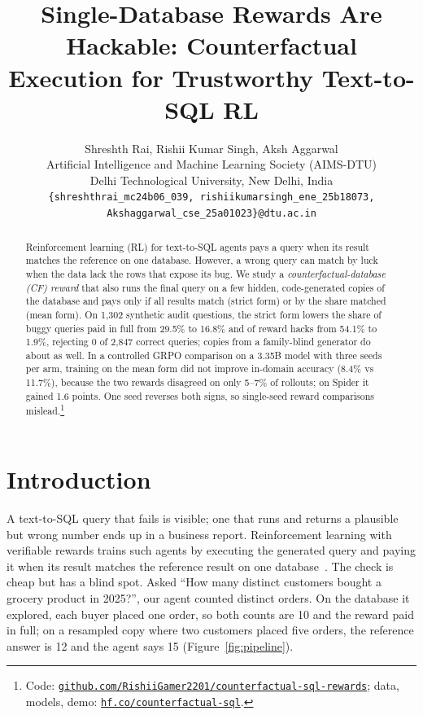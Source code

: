 \documentclass{article}
\title{Single-Database Rewards Are Hackable: Counterfactual Execution for Trustworthy Text-to-SQL RL}
\author{%
  Shreshth Rai, \quad Rishii Kumar Singh, \quad Aksh Aggarwal \\
  Artificial Intelligence and Machine Learning Society (AIMS-DTU) \\
  Delhi Technological University, New Delhi, India \\
  {\small\texttt{\{shreshthrai\_mc24b06\_039, rishiikumarsingh\_ene\_25b18073,}} \\
  {\small\texttt{Akshaggarwal\_cse\_25a01023\}@dtu.ac.in}}
}
\begin{document}
\maketitle

\begin{abstract}
Reinforcement learning (RL) for text-to-SQL agents pays a query when its result matches the reference on one database. However, a wrong query can match by luck when the data lack the rows that expose its bug. We study a \emph{counterfactual-database (CF) reward} that also runs the final query on a few hidden, code-generated copies of the database and pays only if all results match (strict form) or by the share matched (mean form). On 1,302 synthetic audit questions, the strict form lowers the share of buggy queries paid in full from 29.5\% to 16.8\% and of reward hacks from 54.1\% to 1.9\%, rejecting 0 of 2,847 correct queries; copies from a family-blind generator do about as well. In a controlled GRPO comparison on a 3.35B model with three seeds per arm, training on the mean form did not improve in-domain accuracy (8.4\% vs 11.7\%), because the two rewards disagreed on only 5--7\% of rollouts; on Spider it gained 1.6 points. One seed reverses both signs, so single-seed reward comparisons mislead.\footnote{Code: \href{https://github.com/RishiiGamer2201/counterfactual-sql-rewards}{\nolinkurl{github.com/RishiiGamer2201/counterfactual-sql-rewards}}; data, models, demo: \href{https://huggingface.co/counterfactual-sql}{\nolinkurl{hf.co/counterfactual-sql}}.}
\end{abstract}

\section{Introduction}
\label{sec:intro}

A text-to-SQL query that fails is visible; one that runs and returns a plausible but wrong number ends up in a business report. Reinforcement learning with verifiable rewards trains such agents by executing the generated query and paying it when its result matches the reference result on one database~\citep{ma2026sql,pourreza2025reasoningsql,yao2026arctic}. The check is cheap but has a blind spot. Asked ``How many distinct customers bought a grocery product in 2025?'', our agent counted distinct orders. On the database it explored, each buyer placed one order, so both counts are 10 and the reward paid in full; on a resampled copy where two customers placed five orders, the reference answer is 12 and the agent says 15 (Figure~\ref{fig:pipeline}).
\end{document}
